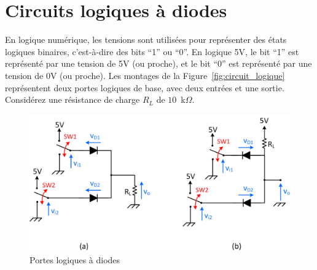 \documentclass{../template/labo}
\begin{document}
\clearpage
\section{Circuits logiques à diodes}

En logique numérique, les tensions sont utilisées pour représenter des états logiques binaires, c'est-à-dire des bits ``1'' ou ``0''. En logique 5V, le bit ``1'' est représenté par une tension de 5V (ou proche), et le bit ``0'' est représenté par une tension de 0V (ou proche). Les montages de la Figure~\vref{fig:circuit_logique} représentent deux portes logiques de base, avec deux entrées et une sortie. Considérez une résistance de charge $R_L$ de $10$~k$\Omega$. 
\begin{figure}[h!]
	\begin{center}
		\includegraphics[scale=0.85]{figures/Circuits_logiques_diodes.png}
	\end{center}
\caption{Portes logiques à diodes}
\label{fig:circuit_logique}
\end{figure}
\end{document}
